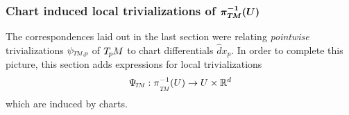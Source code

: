 \subsubsection[Chart induced local trivializations of \texorpdfstring{$    \pi_{\TM}^{-1}(U) $}{TU}]%
              {Chart induced local trivializations of \texorpdfstring{$\bm{\pi_{T\mkern-1.5muM}^{-1}(U)}$}{TU}}
\label{apx:correspondences_chart_gauge_local}

The correspondences laid out in the last section were relating \emph{pointwise} trivializations $\psiTMp$ of $T_{\mkern-1.5mu p}\mkern-.5muM$ to chart differentials $\hat{d}x_p$.
In order to complete this picture, this section adds expressions for local trivializations
\begin{align}
    \PsiTM: \piTM^{-1}(U) \to U \times \R^d
\end{align}
which are induced by charts.

